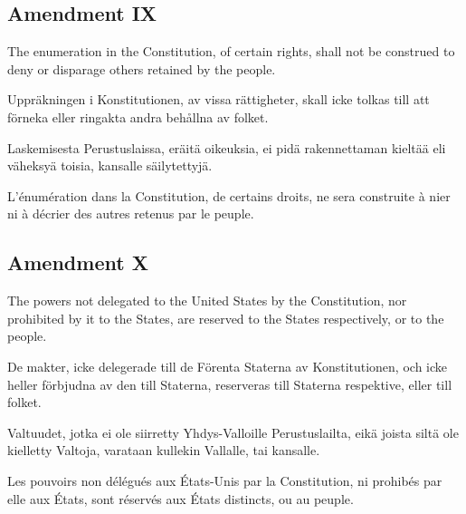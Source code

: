 \documentclass[a4paper,landscape,12pt]{article}
\begin{document}
\subsection*{Amendment IX}
\begin{minipage}[t]{0.22\textwidth}
The enumeration in the Constitution, of certain rights, shall not be construed to deny or disparage others retained by the people.
\end{minipage}\textwidth
\begin{minipage}[t]{0.22\textwidth}
Uppräkningen i Konstitutionen, av vissa rättigheter, skall icke tolkas till att förneka eller ringakta andra behållna av folket.
\end{minipage}\textwidth
\begin{minipage}[t]{0.22\textwidth}
Laskemisesta Perustuslaissa, eräitä oikeuksia, ei pidä rakennettaman kieltää eli väheksyä toisia, kansalle säilytettyjä.
\end{minipage}\textwidth
\begin{minipage}[t]{0.22\textwidth}
L'énumération dans la Constitution, de certains droits, ne sera construite à nier ni à décrier des autres retenus par le peuple.
\end{minipage}

\subsection*{Amendment X}
\begin{minipage}[t]{0.22\textwidth}
The powers not delegated to the United States by the Constitution, nor prohibited by it to the States, are reserved to the States respectively, or to the people.
\end{minipage}\textwidth
\begin{minipage}[t]{0.22\textwidth}
De makter, icke delegerade till de Förenta Staterna av Konstitutionen, och icke heller förbjudna av den till Staterna, reserveras till Staterna respektive, eller till folket.
\end{minipage}\textwidth
\begin{minipage}[t]{0.22\textwidth}
Valtuudet, jotka ei ole siirretty Yhdys-Valloille Perustuslailta, eikä joista siltä ole kielletty Valtoja, varataan kullekin Vallalle, tai kansalle.
\end{minipage}\textwidth
\begin{minipage}[t]{0.22\textwidth}
Les pouvoirs non délégués aux États-Unis par la Constitution, ni prohibés par elle aux États, sont réservés aux États distincts, ou au peuple.
\end{minipage}
\end{document}
